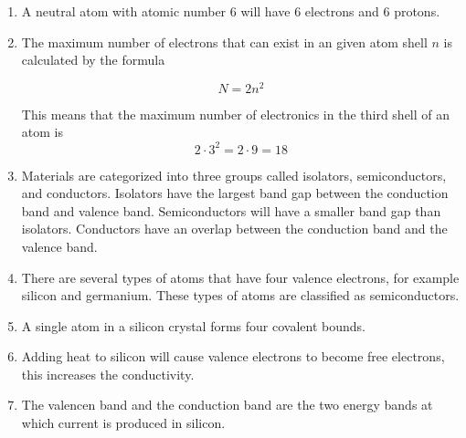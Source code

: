 \documentclass[fleqn]{article}
\begin{document}
\begin{enumerate}[label=\textbf{\arabic*.}]

\item A neutral atom with atomic number 6 will have 6 electrons and 6 protons. 
  
\item The maximum number of electrons that can exist in an given atom shell $ n $ is calculated by the formula

\[
  N = 2n^2
\]

This means that the maximum number of electronics in the third shell of an atom is
\[ 
  2 \cdot 3^2 = 2 \cdot 9 = 18
\]

\item
Materials are categorized into three groups called isolators, semiconductors, and conductors. Isolators have the largest band gap between the conduction band and valence band. Semiconductors will have a smaller band gap than isolators. Conductors have an overlap between the conduction band and the valence band.

\item
There are several types of atoms that have four valence electrons, for example silicon and germanium. These types of atoms are classified as semiconductors.

\item
A single atom in a silicon crystal forms four covalent bounds.

\item
Adding heat to silicon will cause valence electrons to become free electrons, this increases the conductivity.

\item
The valencen band and the conduction band are the two energy bands at which current is produced in silicon.

\end{enumerate}
\end{document}
